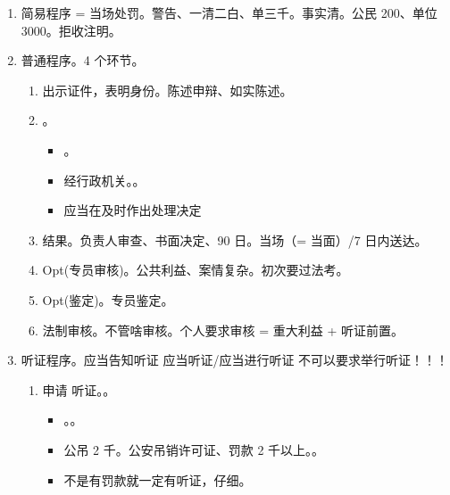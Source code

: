 \begin{enumerate}
\begin{enumerate}
\begin{enumerate}
\begin{enumerate}
                        \end{enumerate}
                  \item 简易程序 = 当场处罚。警告、一清二白、单三千。事实清。公民 200、单位 3000。拒收注明。
                  \item 普通程序。4 个环节。
                        \begin{enumerate}
                          \item 出示证件，表明身份。陈述申辩、如实陈述。
                          \item {}。
                                \begin{itemize}
                                  \item {}。
                                  \item 经行政机关。。
                                  \item 应当在及时作出处理决定
                                \end{itemize}
                          \item 结果。负责人审查、书面决定、90 日。当场（= 当面）/7 日内送达。
                          \item Opt(专员审核)。公共利益、案情复杂。初次要过法考。
                          \item Opt(鉴定)。专员鉴定。
                          \item 法制审核。\sjt 不管啥审核。个人要求审核 = 重大利益 + 听证前置。
                        \end{enumerate}
                  \item 听证程序。应当告知听证 \bdy 应当听证/应当进行听证 \bdy 不可以要求举行听证！！！
                        \begin{enumerate}
                          \item {} \yjt 申请 \yjt 听证。。
                                \begin{itemize}
                                  \item {}。。
                                  \item 公吊 2 千。公安吊销许可证、罚款 2 千以上。。
                                  \item 不是有罚款就一定有听证，仔细。

\end{itemize}
\end{enumerate}
\end{enumerate}
\end{enumerate}
\end{enumerate}

